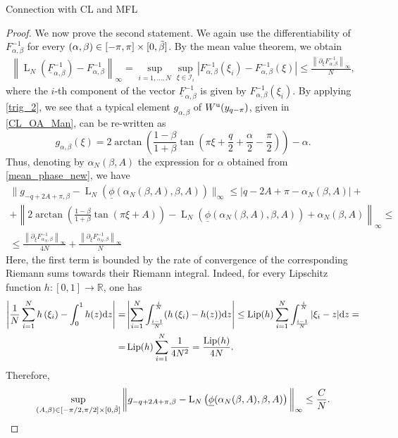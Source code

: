 \documentclass{article}
\theoremstyle{definition}
\newcommand{\R}{\mathbb{R}}
\renewcommand{\u}{\textnormal{u}}
\renewcommand{\d}{\textnormal{d}}
\renewcommand{\L}{\operatorname{L}}
\begin{document}
\begin{section}{Connection with CL and MFL}
\begin{proof}
We now prove the second statement. We again use the differentiability of $F^{-1}_{\alpha,\beta}$ for every $(\alpha,\beta)\in[-\pi,\pi]\times[0,\Tilde{\beta}]$. By the mean value theorem, we obtain
\begin{align*}
\left\|\L_N\left(\underline{F}^{-1}_{\alpha,\beta}\right)-F^{-1}_{\alpha,\beta}\right\|_\infty=\sup_{i=1,\ldots,N}\sup_{\xi\in\mathcal{I}_i}\left|F^{-1}_{\alpha,\beta}(\xi_i)-F^{-1}_{\alpha,\beta}(\xi)\right|\leq\frac{\left\|\partial_\xi F^{-1}_{\alpha,\beta}\right\|_\infty}{N},
\end{align*}
where the $i$-th component of the vector $\underline{F}^{-1}_{\alpha,\beta}$ is given by ${F}^{-1}_{\alpha,\beta}(\xi_i)$. By applying \eqref{trig_2}, we see that a typical element $g_{\alpha,\beta}$ of $W^\u(y_{q-\pi})$, given in \eqref{CL_OA_Man}, can be re-written as
$$g_{\alpha,\beta}(\xi)=2\arctan\left(\frac{1-\beta}{1+\beta}\tan\left(\pi\xi+\frac{q}{2}+\frac{\alpha}{2}-\frac{\pi}{2}\right)\right)-\alpha.$$
Thus, denoting by $\alpha_N(\beta,A)$ the expression for $\alpha$ obtained from \eqref{mean_phase_new}, we have
\begin{align*}
        \bigg\|g_{-q+2A+\pi,\beta}-\L_N\left(\underline{\phi}(\alpha_N(\beta,A),\beta,A)\right)\bigg\|_\infty\leq\big|q-2A+\pi-\alpha_N(\beta,A)\big|+\\
        +\left\|2\arctan\left(\frac{1-\beta}{1+\beta}\tan\left(\pi\xi+A\right)\right)-\L_N\left(\underline{\phi}(\alpha_N(\beta,A),\beta,A)\right)+\alpha_N(\beta,A)\right\|_{\infty}\leq\\
        \leq \frac{\left\|\partial_\xi F^{-1}_{\alpha_{N},\beta}\right\|_\infty}{4N}+\frac{\left\|\partial_\xi F^{-1}_{\alpha_{N},\beta}\right\|_\infty}{N}
    \end{align*}
Here, the first term is bounded by the rate of convergence of the corresponding Riemann sums towards their Riemann integral. Indeed, for every Lipschitz function $h:[0,1]\rightarrow\R$, one has
\begin{align*}
        \left|\frac{1}{N}\sum_{i=1}^N h\left(\xi_i\right)-\int_0^1h(z)\d z\right|=&\left|\sum_{i=1}^N\int_{\frac{i-1}{N}}^{\frac{i}{N}} (h\left(\xi_i\right)-h(z))\d z\right|\leq\operatorname{Lip}(h)\sum_{i=1}^N\int_{\frac{i-1}{N}}^{\frac{i}{N}} |\xi_i-z|\d z=\\
        =&\operatorname{Lip}(h)\sum_{i=1}^N\frac{1}{4N^2}=\frac{\operatorname{Lip}(h)}{4N}.
    \end{align*}
Therefore,
$$\sup_{(A,\beta)\in[-\pi/2,\pi/2]\times[0,\Tilde{\beta}]}\bigg\|g_{-q+2A+\pi,\beta}-\L_N\left(\underline{\phi}(\alpha_N(\beta,A),\beta,A)\right)\bigg\|_\infty\leq \frac{C}{N}.$$

\end{proof}
\end{section}
\end{document}
